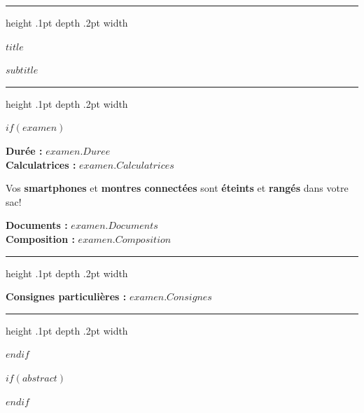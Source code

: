 \medskip

\hrule height .1pt depth .2pt width \textwidth

\begin{center}
\bigskip
\textbf{\sffamily\Large $title$} 

\vspace{1pt}

\textbf{\sffamily\large $subtitle$}
\medskip
\end{center}
\medskip
\hrule height .1pt depth .2pt width \textwidth
\medskip

$if(examen)$

\begin{minipage}[t]{.5\textwidth}
\flushleft
\textbf{\textcolor{gsi_violet}{Durée :}} $examen.Duree$ \\[2pt]
\textbf{\textcolor{gsi_violet}{Calculatrices :}} $examen.Calculatrices$ \\[2pt] 
\end{minipage}
\hfill
\begin{minipage}[t]{.49\textwidth}
\flushright
Vos \textbf{smartphones} et \textbf{montres connectées} sont \textbf{éteints} et \textbf{rangés} dans votre sac!
\end{minipage}

\textbf{\textcolor{gsi_violet}{Documents :}} $examen.Documents$ \\[2pt] 
\textbf{\textcolor{gsi_violet}{Composition :}} $examen.Composition$ \\[2pt] 


\hrule height .1pt depth .2pt width \textwidth

\medskip
\textbf{\textcolor{gsi_violet}{Consignes particulières :}} $examen.Consignes$ 
\bigskip

\hrule height .1pt depth .2pt width \textwidth

\bigskip

$endif$


$if(abstract)$
\begin{abstract}
$abstract$
\end{abstract}
$endif$




\newcommand{\red}[1]{{\color{red}#1}}